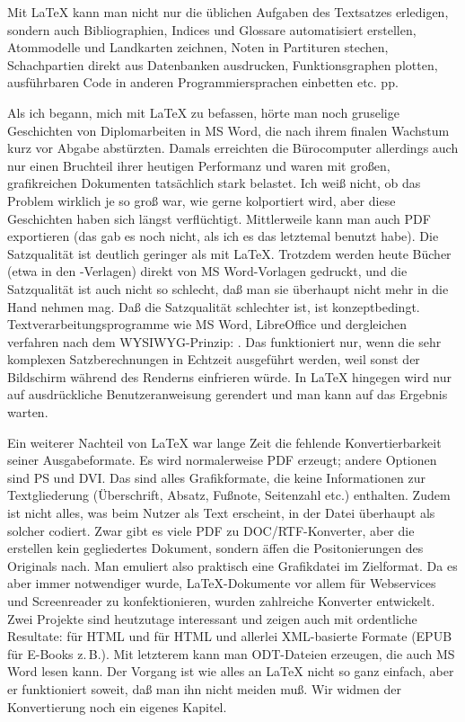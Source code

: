 \documentclass[12pt]{scrreprt}
\begin{document}
Mit \LaTeX{} kann man nicht nur die üblichen Aufgaben des Textsatzes erledigen, sondern auch Bibliographien, Indices und Glossare automatisiert erstellen, Atommodelle und Landkarten zeichnen, Noten in Partituren stechen, Schachpartien direkt aus Datenbanken ausdrucken, Funktionsgraphen plotten, ausführbaren Code in anderen Programmiersprachen einbetten etc. pp.

Als ich begann, mich mit \LaTeX{} zu befassen, hörte man noch gruselige Geschichten von Diplomarbeiten in MS Word, die nach ihrem finalen Wachstum kurz vor Abgabe abstürzten. Damals erreichten die Bürocomputer allerdings auch nur einen Bruchteil ihrer heutigen Performanz und waren mit großen, grafikreichen Dokumenten tatsächlich stark belastet. Ich weiß nicht, ob das Problem wirklich je so groß war, wie gerne kolportiert wird, aber diese Geschichten haben sich längst verflüchtigt. Mittlerweile kann man auch PDF exportieren (das gab es noch nicht, als ich es das letztemal benutzt habe). Die Satzqualität ist deutlich geringer als mit \LaTeX. Trotzdem werden heute Bücher (etwa in den -Verlagen) direkt von MS Word-Vorlagen gedruckt, und die Satzqualität ist auch nicht so schlecht, daß man sie überhaupt nicht mehr in die Hand nehmen mag. Daß die Satzqualität schlechter ist, ist konzeptbedingt. Textverarbeitungsprogramme wie MS Word, LibreOffice und dergleichen verfahren nach dem WYSIWYG-Prinzip: . Das funktioniert nur, wenn die sehr komplexen Satzberechnungen in Echtzeit ausgeführt werden, weil sonst der Bildschirm während des Renderns  einfrieren würde. In \LaTeX{} hingegen wird nur auf ausdrückliche Benutzeranweisung gerendert und man kann auf das Ergebnis warten.

Ein weiterer Nachteil von \LaTeX{} war lange Zeit die fehlende Konvertierbarkeit seiner Ausgabeformate. Es wird normalerweise PDF erzeugt; andere Optionen sind PS und DVI. Das sind alles Grafikformate, die keine Informationen zur Textgliederung (Überschrift, Absatz, Fußnote, Seitenzahl etc.) enthalten. Zudem ist nicht alles, was beim Nutzer als Text erscheint, in der Datei überhaupt als solcher codiert. Zwar gibt es viele PDF zu DOC/RTF-Konverter, aber die erstellen kein gegliedertes Dokument, sondern äffen die Positonierungen des Originals nach. Man emuliert also praktisch eine Grafikdatei im Zielformat. Da es aber immer notwendiger wurde, \LaTeX{}-Dokumente vor allem für Webservices und Screenreader zu konfektionieren, wurden zahlreiche  Konverter entwickelt. Zwei Projekte sind heutzutage interessant und zeigen auch mit \archbib ordentliche Resultate:
\Paket{\LaTeXML{}} für HTML und  für HTML und allerlei XML-basierte Formate (EPUB für E-Books z.\,B.). Mit letzterem kann man ODT-Dateien erzeugen, die auch MS Word lesen kann. Der Vorgang ist wie alles an \LaTeX{} nicht so ganz einfach, aber er funktioniert soweit, daß man ihn nicht meiden muß. Wir widmen der Konvertierung noch ein eigenes Kapitel.
\end{document}
